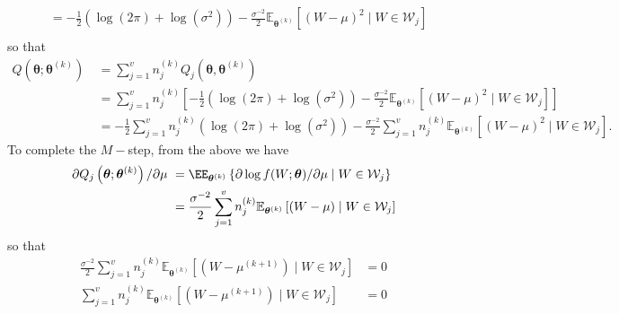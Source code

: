\begin{exam}
\begin{align*}
         & = - \frac{1}{2} \left( \log \left( 2 \pi \right) + \log \left( \sigma^2 \right) \right) - \frac{\sigma^{-2}}{2} \mathbb{E}_{\bm{\theta}^{(k)}} \left[ \left( W - \mu \right)^2 \mid W \in \mathcal{W}_{j} \right]  \\
    \end{align*}
    so that
    \begin{align*}
        Q \left( \bm{\theta}; \bm{\theta}^{(k)} \right) \
         & = \sum_{j=1}^{v} n_{j}^{(k)} Q_j (\bm{\theta} , \bm{\theta}^{(k)})                                                                                                                                                                                                       \\
         & = \sum_{j=1}^{v} n_{j}^{(k)} \left[ - \frac{1}{2} \left( \log \left( 2 \pi \right) + \log \left( \sigma^2 \right) \right) - \frac{\sigma^{-2}}{2} \mathbb{E}_{\bm{\theta}^{(k)}} \left[ \left( W - \mu \right)^2 \mid W \in \mathcal{W}_{j} \right] \right]              \\
         & = - \frac{1}{2} \sum_{j=1}^{v} n_{j}^{(k)} \left( \log \left( 2 \pi \right) + \log \left( \sigma^2 \right) \right) - \frac{\sigma^{-2}}{2} \sum_{j=1}^{v} n_{j}^{(k)} \mathbb{E}_{\bm{\theta}^{(k)}} \left[ \left( W - \mu \right)^2 \mid W \in \mathcal{W}_{j} \right].
    \end{align*}
    To complete the $M-$step, from the above we have
    \begin{align*}
        \partial Q_{j}\left(\boldsymbol{\theta} ; \boldsymbol{\theta}^{(k)}\right) / \partial \mu \
         & = \EE_{\boldsymbol{\theta}^{(k)}}\left\{\partial \log f(W ; \boldsymbol{\theta}) / \partial \mu \mid W \in \mathcal{W}_{j}\right\}                 \\
         & = \frac{\sigma^{-2}}{2} \sum_{j=1}^{v} n_{j}^{(k)} \mathbb{E}_{\bm{\theta}^{(k)}} \left[ \left( W - \mu \right) \mid W \in \mathcal{W}_{j} \right]
    \end{align*}
    so that
    \begin{align*}
        \frac{\sigma^{-2}}{2} \sum_{j=1}^{v} n_{j}^{(k)} \mathbb{E}_{\bm{\theta}^{(k)}} \left[ \left( W - \mu^{(k+1)} \right) \mid W \in \mathcal{W}_{j} \right] & = 0                                                                                                                                                     \\
        \sum_{j=1}^{v} n_{j}^{(k)} \mathbb{E}_{\bm{\theta}^{(k)}} \left[ \left( W - \mu^{(k+1)} \right) \mid W \in \mathcal{W}_{j} \right]                       & = 0                                                                                                                                                     \\

\end{align*}
\end{exam}
